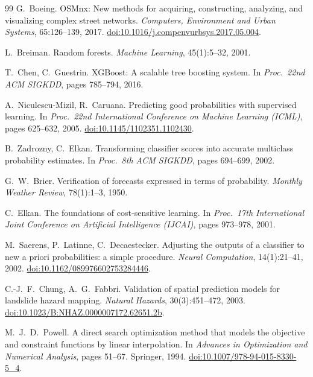 \documentclass[10pt,twocolumn]{article}
\begin{document}
{\begin{thebibliography}{99}
G.~Boeing.
OSMnx: New methods for acquiring, constructing, analyzing, and visualizing
complex street networks.
\emph{Computers, Environment and Urban Systems}, 65:126--139, 2017.
\href{https://doi.org/10.1016/j.compenvurbsys.2017.05.004}{doi:10.1016/j.compenvurbsys.2017.05.004}.

L.~Breiman. Random forests. \emph{Machine Learning}, 45(1):5--32, 2001.

T.~Chen, C.~Guestrin.
XGBoost: A scalable tree boosting system.
In \emph{Proc.\ 22nd ACM SIGKDD}, pages 785--794, 2016.

A.~Niculescu-Mizil, R.~Caruana.
Predicting good probabilities with supervised learning.
In \emph{Proc.\ 22nd International Conference on Machine Learning (ICML)},
pages 625--632, 2005.
\href{https://doi.org/10.1145/1102351.1102430}{doi:10.1145/1102351.1102430}.

B.~Zadrozny, C.~Elkan.
Transforming classifier scores into accurate multiclass probability estimates.
In \emph{Proc.\ 8th ACM SIGKDD}, pages 694--699, 2002.

G.~W.~Brier.
Verification of forecasts expressed in terms of probability.
\emph{Monthly Weather Review}, 78(1):1--3, 1950.

C.~Elkan.
The foundations of cost-sensitive learning.
In \emph{Proc.\ 17th International Joint Conference on Artificial Intelligence
(IJCAI)}, pages 973--978, 2001.

M.~Saerens, P.~Latinne, C.~Decaestecker.
Adjusting the outputs of a classifier to new a priori probabilities: a simple
procedure.
\emph{Neural Computation}, 14(1):21--41, 2002.
\href{https://doi.org/10.1162/089976602753284446}{doi:10.1162/089976602753284446}.

C.-J.~F.~Chung, A.~G.~Fabbri.
Validation of spatial prediction models for landslide hazard mapping.
\emph{Natural Hazards}, 30(3):451--472, 2003.
\href{https://doi.org/10.1023/B:NHAZ.0000007172.62651.2b}{doi:10.1023/B:NHAZ.0000007172.62651.2b}.

M.~J.~D.~Powell.
A direct search optimization method that models the objective and constraint
functions by linear interpolation.
In \emph{Advances in Optimization and Numerical Analysis}, pages 51--67.
Springer, 1994.
\href{https://doi.org/10.1007/978-94-015-8330-5_4}{doi:10.1007/978-94-015-8330-5\_4}.


\end{thebibliography}}
\end{document}
